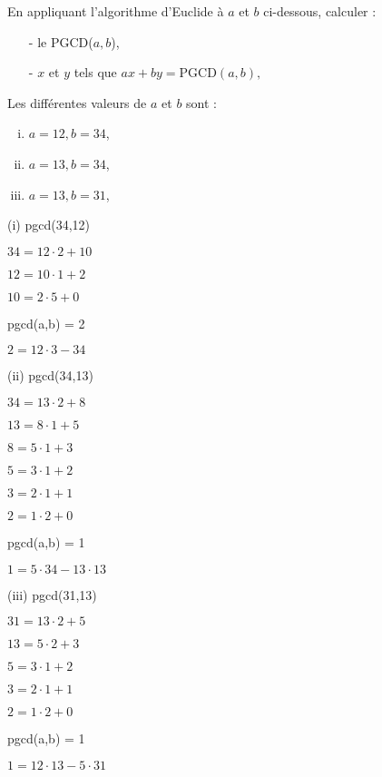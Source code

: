 
\vspace*{0.8cm}
\begin{exo}
En appliquant l'algorithme d'Euclide \`a $a$ et $b$ ci-dessous, calculer :
\begin{itemize}
\item[-] le PGCD($a,b$),
\item[-] $x$ et $y$ tels que $ ax + by = \text{PGCD}(a,b),$
\end{itemize}
Les diff\'erentes valeurs de $a$ et $b$ sont :
\begin{enumerate}[(i)]
\item $a = 12, b = 34$,
\item $a = 13, b = 34$,
\item $a = 13, b = 31$,
\end{enumerate}
\end{exo}

\begin{minipage}{0.33\textwidth}
   (i) pgcd(34,12)
   \vspace{0.25cm}

   $34 = 12 \cdot 2 + 10$

   $12 = 10 \cdot 1 + 2$

   $10 = 2 \cdot 5 + 0$

   pgcd(a,b) = 2
   \vspace{0.25cm}

   $2 = 12 \cdot 3 - 34$
\end{minipage}\begin{minipage}{0.33\textwidth}
   \vspace{-0.12cm}
   (ii) pgcd(34,13)
   \vspace{0.25cm}

   $34 = 13 \cdot 2 + 8$

   $13 = 8 \cdot 1 + 5$

   $8 = 5 \cdot 1 + 3$

   $5 = 3 \cdot 1 + 2$

   $3 = 2 \cdot 1 + 1$

   $2 = 1 \cdot 2 + 0$

   pgcd(a,b) = 1
   \vspace{0.25cm}

   $1 = 5 \cdot 34 - 13 \cdot 13 $
\end{minipage}\begin{minipage}{0.33\textwidth}
   \vspace{-0.12cm}
   (iii) pgcd(31,13)
   \vspace{0.25cm}

   $31 = 13 \cdot 2 + 5$

   $13 = 5 \cdot 2 + 3$

   $5 = 3 \cdot 1 + 2$

   $3 = 2 \cdot 1 + 1$

   $2 = 1 \cdot 2 + 0$

   pgcd(a,b) = 1
   \vspace{0.25cm}

   $1 = 12 \cdot 13 - 5 \cdot 31$
\end{minipage}

